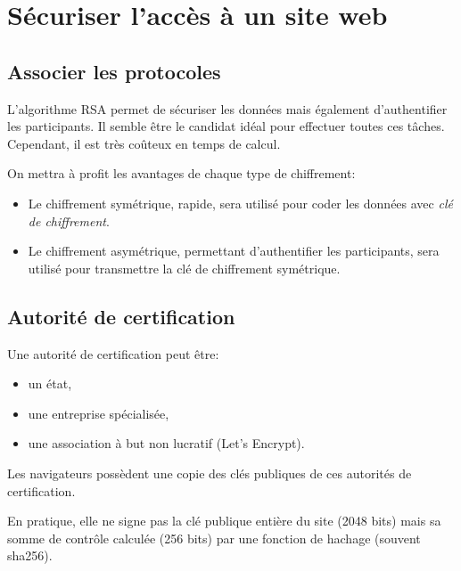 \documentclass[a4paper,11pt]{article}
\begin{document}
\section{Sécuriser l'accès à un site web}
\subsection{Associer les protocoles}
L'algorithme RSA permet de sécuriser les données mais également d'authentifier les participants. Il semble être le candidat idéal pour effectuer toutes ces tâches. Cependant, il est très coûteux en temps de calcul.
\begin{aretenir}[]
On mettra à profit les avantages de chaque type de chiffrement:
\begin{itemize}
    \item Le chiffrement symétrique, rapide, sera utilisé pour coder les données avec \emph{clé de chiffrement}.
    \item Le chiffrement asymétrique, permettant d'authentifier les participants, sera utilisé pour transmettre la clé de chiffrement symétrique.
\end{itemize}
\end{aretenir}
\subsection{Autorité de certification}
Une autorité de certification peut être:
\begin{itemize}
    \item un état,
    \item une entreprise spécialisée,
    \item une association à but non lucratif (Let's Encrypt).
\end{itemize}
Les navigateurs possèdent une copie des clés publiques de ces autorités de certification.

En pratique, elle ne signe pas la clé publique entière du site (2048 bits) mais sa somme de contrôle calculée (256 bits) par une fonction de hachage (souvent sha256).
\end{document}
